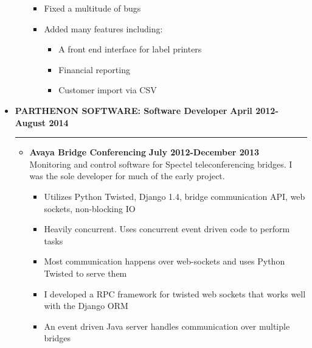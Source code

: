 \documentclass[overlapped]{res}
\begin{document}
\begin{resume}
\begin{itemize}[leftmargin=0in]
\begin{itemize}[leftmargin=0in]
\begin{samepage}
\begin{itemize}
                        \item[\textbullet] Fixed a multitude of bugs
                        \item[\textbullet] Added many features including:
                            \begin{itemize} 
                                \item[\textbullet] A front end interface for label printers 
                                \item[\textbullet] Financial reporting
                                \item[\textbullet] Customer import via CSV 
                            \end{itemize}
                    \end{itemize}
                \end{samepage}
        \end{itemize}
        \vspace{0.125in}
    \item[] 
        \textbf{PARTHENON SOFTWARE: Software Developer} \hfill \textbf{April 2012-August 2014} \\[-0.1in] \rule{\textwidth}{0.5pt}
        \begin{itemize}[leftmargin=0in]
            \item[] 
                \begin{samepage}
                    \textbf{Avaya Bridge Conferencing} \hfill \textbf{July 2012-December 2013} \\
                    Monitoring and control software for Spectel teleconferencing bridges. I was the sole developer for much of the early project.
                    \begin{itemize}
                        \item[\textbullet] Utilizes Python Twisted, Django 1.4, bridge communication API, web sockets, non-blocking IO
                        \item[\textbullet] Heavily concurrent. Uses concurrent event driven code to perform tasks
                        \item[\textbullet] Most communication happens over web-sockets and uses Python Twisted to serve them
                        \item[\textbullet] I developed a RPC framework for twisted web sockets that works well with the Django ORM
                        \item[\textbullet] An event driven Java server handles communication over multiple bridges

\end{itemize}
\end{samepage}
\end{itemize}
\end{itemize}
\end{resume}
\end{document}
